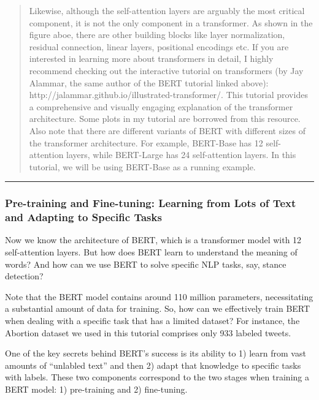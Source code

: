 \documentclass[11pt]{article}
\begin{document}
\begin{quote}
Likewise, although the self-attention layers are arguably the most
critical component, it is not the only component in a transformer. As
shown in the figure aboe, there are other building blocks like layer
normalization, residual connection, linear layers, positional encodings
etc. If you are interested in learning more about transformers in
detail, I highly recommend checking out the interactive tutorial on
transformers (by Jay Alammar, the same author of the BERT tutorial
linked above): http://jalammar.github.io/illustrated-transformer/. This
tutorial provides a comprehensive and visually engaging explanation of
the transformer architecture. Some plots in my tutorial are borrowed
from this resource. Also note that there are different variants of BERT
with different sizes of the transformer architecture. For example,
BERT-Base has 12 self-attention layers, while BERT-Large has 24
self-attention layers. In this tutorial, we will be using BERT-Base as a
running example.
\end{quote}

    \begin{center}\rule{0.5\linewidth}{0.5pt}\end{center}

    \hypertarget{pre-training-and-fine-tuning-learning-from-lots-of-text-and-adapting-to-specific-tasks}{%
\subsubsection{Pre-training and Fine-tuning: Learning from Lots of Text
and Adapting to Specific
Tasks}\label{pre-training-and-fine-tuning-learning-from-lots-of-text-and-adapting-to-specific-tasks}}

Now we know the architecture of BERT, which is a transformer model with
12 self-attention layers. But how does BERT learn to understand the
meaning of words? And how can we use BERT to solve specific NLP tasks,
say, stance detection?

Note that the BERT model contains around 110 million parameters,
necessitating a substantial amount of data for training. So, how can we
effectively train BERT when dealing with a specific task that has a
limited dataset? For instance, the Abortion dataset we used in this
tutorial comprises only 933 labeled tweets.

One of the key secrets behind BERT's success is its ability to 1) learn
from vast amounts of ``unlabled text'' and then 2) adapt that knowledge
to specific tasks with labels. These two components correspond to the
two stages when training a BERT model: 1) pre-training and 2)
fine-tuning.
\end{document}

